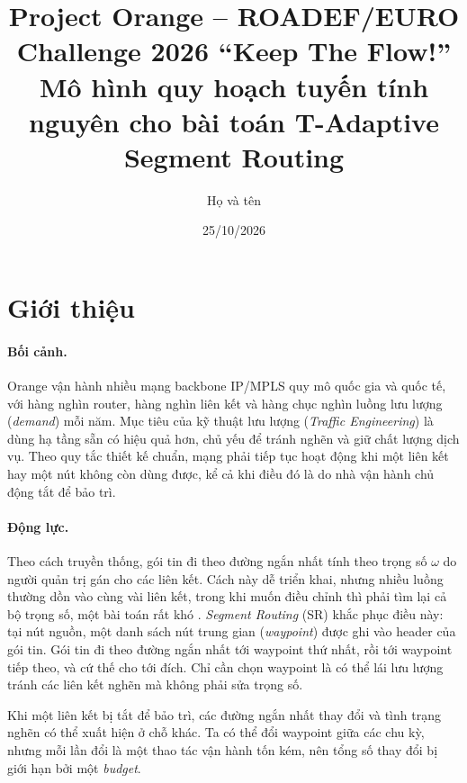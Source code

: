 \documentclass[11pt,a4paper]{article}
\title{\textbf{Project Orange -- ROADEF/EURO Challenge 2026 ``Keep The Flow!''}\\[2pt]
\large Mô hình quy hoạch tuyến tính nguyên cho bài toán T-Adaptive Segment Routing}
\author{%
Họ và tên}
\date{25/10/2026}
\begin{document}
\maketitle

\section{Giới thiệu}

\paragraph{Bối cảnh.}
Orange vận hành nhiều mạng backbone IP/MPLS quy mô quốc gia và quốc tế, với hàng nghìn router, hàng nghìn liên kết và hàng chục nghìn luồng lưu lượng (\emph{demand}) mỗi năm.
Mục tiêu của kỹ thuật lưu lượng (\emph{Traffic Engineering}) là dùng hạ tầng sẵn có hiệu quả hơn, chủ yếu để tránh nghẽn và giữ chất lượng dịch vụ.
Theo quy tắc thiết kế chuẩn, mạng phải tiếp tục hoạt động khi một liên kết hay một nút không còn dùng được, kể cả khi điều đó là do nhà vận hành chủ động tắt để bảo trì.

\paragraph{Động lực.}
Theo cách truyền thống, gói tin đi theo đường ngắn nhất tính theo trọng số $\omega$ do người quản trị gán cho các liên kết.
Cách này dễ triển khai, nhưng nhiều luồng thường dồn vào cùng vài liên kết, trong khi muốn điều chỉnh thì phải tìm lại cả bộ trọng số, một bài toán rất khó \cite{fortz2000}.
\emph{Segment Routing} (SR) \cite{rfc8402} khắc phục điều này: tại nút nguồn, một danh sách nút trung gian (\emph{waypoint}) được ghi vào header của gói tin.
Gói tin đi theo đường ngắn nhất tới waypoint thứ nhất, rồi tới waypoint tiếp theo, và cứ thế cho tới đích.
Chỉ cần chọn waypoint là có thể lái lưu lượng tránh các liên kết nghẽn mà không phải sửa trọng số.

Khi một liên kết bị tắt để bảo trì, các đường ngắn nhất thay đổi và tình trạng nghẽn có thể xuất hiện ở chỗ khác.
Ta có thể đổi waypoint giữa các chu kỳ, nhưng mỗi lần đổi là một thao tác vận hành tốn kém, nên tổng số thay đổi bị giới hạn bởi một \emph{budget}.
\end{document}
